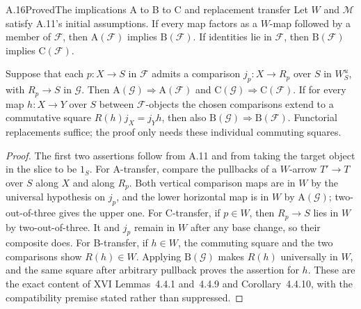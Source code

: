 \begin{claim}{A.16}{Proved}{The implications A to B to C and replacement transfer}
Let $W$ and $\mathcal M$ satisfy A.11's initial assumptions. If every map factors as a $W$-map followed by a member of $\mathcal F$, then $\mathrm A(\mathcal F)$ implies $\mathrm B(\mathcal F)$. If identities lie in $\mathcal F$, then $\mathrm B(\mathcal F)$ implies $\mathrm C(\mathcal F)$.

Suppose that each $p:X\to S$ in $\mathcal F$ admits a comparison $j_p:X\to R_p$ over $S$ in $W_S^u$, with $R_p\to S$ in $\mathcal G$. Then $\mathrm A(\mathcal G)\Rightarrow\mathrm A(\mathcal F)$ and $\mathrm C(\mathcal G)\Rightarrow\mathrm C(\mathcal F)$. If for every map $h:X\to Y$ over $S$ between $\mathcal F$-objects the chosen comparisons extend to a commutative square $R(h)j_X=j_Yh$, then also $\mathrm B(\mathcal G)\Rightarrow\mathrm B(\mathcal F)$. Functorial replacements suffice; the proof only needs these individual commuting squares.
\end{claim}
\begin{proof}
The first two assertions follow from A.11 and from taking the target object in the slice to be $1_S$. For A-transfer, compare the pullbacks of a $W$-arrow $T'\to T$ over $S$ along $X$ and along $R_p$. Both vertical comparison maps are in $W$ by the universal hypothesis on $j_p$, and the lower horizontal map is in $W$ by $\mathrm A(\mathcal G)$; two-out-of-three gives the upper one. For C-transfer, if $p\in W$, then $R_p\to S$ lies in $W$ by two-out-of-three. It and $j_p$ remain in $W$ after any base change, so their composite does. For B-transfer, if $h\in W$, the commuting square and the two comparisons show $R(h)\in W$. Applying $\mathrm B(\mathcal G)$ makes $R(h)$ universally in $W$, and the same square after arbitrary pullback proves the assertion for $h$. These are the exact content of XVI Lemmas~4.4.1 and~4.4.9 and Corollary~4.4.10, with the compatibility premise stated rather than suppressed.
\end{proof}

